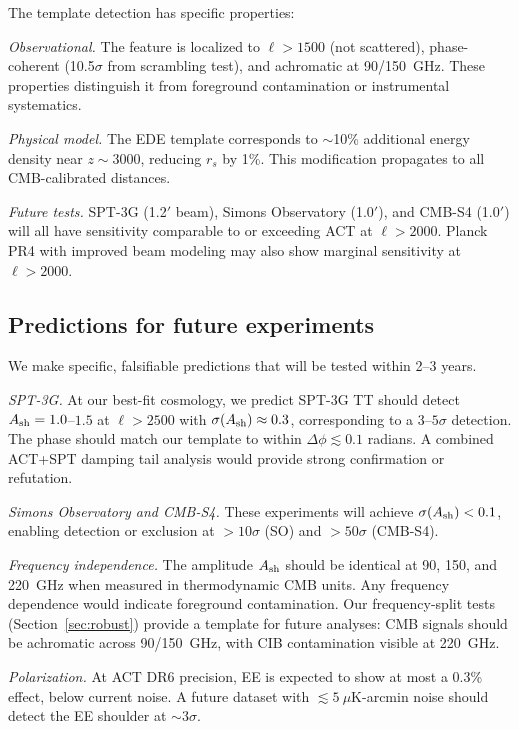 \documentclass[twocolumn,showpacs,preprintnumbers,amsmath,amssymb,prd]{revtex4-2}
\begin{document}
The template detection has specific properties:

\emph{Observational.} The feature is localized to $\ell > 1500$ (not 
scattered), phase-coherent (10.5$\sigma$ from scrambling test), and 
achromatic at 90/150~GHz. These properties distinguish it from 
foreground contamination or instrumental systematics.

\emph{Physical model.} The EDE template corresponds to $\sim$10\% 
additional energy density near $z \sim 3000$, reducing $r_s$ by 1\%. 
This modification propagates to all CMB-calibrated distances.

\emph{Future tests.} SPT-3G (1.2$'$ beam), Simons Observatory (1.0$'$), 
and CMB-S4 (1.0$'$) will all have sensitivity comparable to or exceeding 
ACT at $\ell > 2000$. Planck PR4 with improved beam modeling may also 
show marginal sensitivity at $\ell > 2000$.

\subsection{Predictions for future experiments}
\label{sec:predictions}

We make specific, falsifiable predictions that will be tested within 2--3 years.

\emph{SPT-3G.} At our best-fit cosmology, we predict SPT-3G TT should detect 
$A_{\rm sh} = 1.0$--$1.5$ at $\ell > 2500$ with $\sigma(A_{\rm sh}) \approx 0.3$, 
corresponding to a $3$--$5\sigma$ detection. The phase should match our 
template to within $\Delta\phi \lesssim 0.1$ radians. A combined ACT+SPT 
damping tail analysis would provide strong confirmation or refutation.

\emph{Simons Observatory and CMB-S4.} These experiments will achieve 
$\sigma(A_{\rm sh}) < 0.1$, enabling detection or exclusion at $>10\sigma$ 
(SO) and $>50\sigma$ (CMB-S4).

\emph{Frequency independence.} The amplitude $A_{\rm sh}$ should be 
identical at 90, 150, and 220~GHz when measured in thermodynamic CMB units. 
Any frequency dependence would indicate foreground contamination. Our 
frequency-split tests (Section~\ref{sec:robust}) provide a template for 
future analyses: CMB signals should be achromatic across 90/150~GHz, 
with CIB contamination visible at 220~GHz.

\emph{Polarization.} At ACT DR6 precision, EE is expected to show at most 
a 0.3\% effect, below current noise. A future dataset with 
$\lesssim 5~\mu$K-arcmin noise should detect the EE shoulder at $\sim 3\sigma$.
\end{document}
